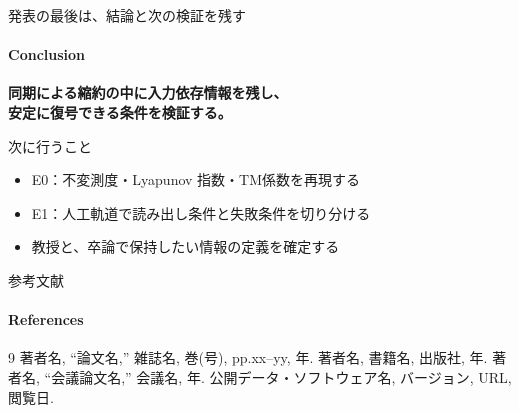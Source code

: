 \documentclass[aspectratio=169,11pt]{beamer}
\begin{document}
\begin{frame}{発表の最後は、結論と次の検証を残す}
  \framesubtitle{Conclusion}
  \Large\bfseries\color{researchink}
  同期による縮約の中に入力依存情報を残し、\\
  安定に復号できる条件を検証する。
  \vspace{6mm}

  {\large\color{researchblue}次に行うこと}
  \normalsize\normalfont\color{researchbody}
  \begin{itemize}
    \item E0：不変測度・Lyapunov 指数・TM係数を再現する
    \item E1：人工軌道で読み出し条件と失敗条件を切り分ける
    \item 教授と、卒論で保持したい情報の定義を確定する
  \end{itemize}
\end{frame}

\begin{frame}{参考文献}
  \framesubtitle{References}
  \small
  \begin{thebibliography}{9}
      著者名, ``論文名,'' 雑誌名, 巻(号), pp.xx--yy, 年.
      著者名, 書籍名, 出版社, 年.
      著者名, ``会議論文名,'' 会議名, 年.
      公開データ・ソフトウェア名, バージョン, URL, 閲覧日.
  \end{thebibliography}
\end{frame}
\end{document}
